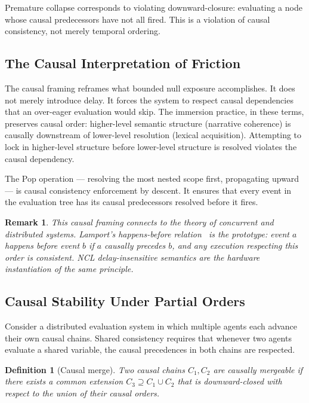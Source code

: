\documentclass[11pt]{article}
\newtheorem{definition}{Definition}
\newtheorem{remark}{Remark}
\theoremstyle{remark}
\begin{document}
Premature collapse corresponds to violating downward-closure: evaluating a node whose causal predecessors have not all fired. This is a violation of causal consistency, not merely temporal ordering.

\subsection{The Causal Interpretation of Friction}

The causal framing reframes what bounded null exposure accomplishes. It does not merely introduce delay. It forces the system to respect causal dependencies that an over-eager evaluation would skip. The immersion practice, in these terms, preserves causal order: higher-level semantic structure (narrative coherence) is causally downstream of lower-level resolution (lexical acquisition). Attempting to lock in higher-level structure before lower-level structure is resolved violates the causal dependency.

The Pop operation --- resolving the most nested scope first, propagating upward --- is causal consistency enforcement by descent. It ensures that every event in the evaluation tree has its causal predecessors resolved before it fires.

\begin{remark}
This causal framing connects to the theory of concurrent and distributed systems. Lamport's happens-before relation~\cite{lamport} is the prototype: event $a$ happens before event $b$ if $a$ causally precedes $b$, and any execution respecting this order is consistent. NCL delay-insensitive semantics are the hardware instantiation of the same principle.
\end{remark}

\subsection{Causal Stability Under Partial Orders}

Consider a distributed evaluation system in which multiple agents each advance their own causal chains. Shared consistency requires that whenever two agents evaluate a shared variable, the causal precedences in both chains are respected.

\begin{definition}[Causal merge]
Two causal chains $C_1, C_2$ are \emph{causally mergeable} if there exists a common extension $C_3 \supseteq C_1 \cup C_2$ that is downward-closed with respect to the union of their causal orders.
\end{definition}
\end{document}
